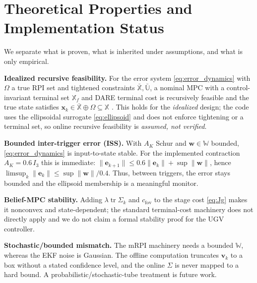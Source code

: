 \documentclass[letterpaper, 10 pt, conference]{ieeeconf}  %
\DeclareMathOperator{\tr}{tr}
\begin{document}
\section{Theoretical Properties and Implementation Status}
\label{sec:theory}

We separate what is proven, what is inherited under assumptions, and what is only
empirical.

\textbf{Idealized recursive feasibility.} For the error system
\eqref{eq:error_dynamics} with $\Omega$ a true RPI set and tightened constraints
$\bar{\mathbb{X}},\bar{\mathbb{U}}$, a nominal MPC with a control-invariant
terminal set $\mathbb{X}_f$ and DARE terminal cost is recursively feasible and the
true state satisfies $\mathbf{x}_k\in\bar{\mathbb{X}}\oplus\Omega\subseteq\mathbb{X}$
\cite{mayne2005robust,mRPI}. This holds for the \emph{idealized} design; the code
uses the ellipsoidal surrogate \eqref{eq:ellipsoid} and does not enforce
tightening or a terminal set, so online recursive feasibility is \emph{assumed,
not verified}.

\textbf{Bounded inter-trigger error (ISS).} With $A_K$ Schur and
$\mathbf{w}\in\mathbb{W}$ bounded, \eqref{eq:error_dynamics} is input-to-state
stable. For the implemented contraction $A_K=0.6\,I_3$ this is immediate:
$\lVert\mathbf{e}_{k+1}\rVert\le 0.6\lVert\mathbf{e}_k\rVert+\sup\lVert\mathbf{w}\rVert$,
hence $\limsup_k\lVert\mathbf{e}_k\rVert\le\sup\lVert\mathbf{w}\rVert/0.4$. Thus,
between triggers, the error stays bounded and the ellipsoid membership is a
meaningful monitor.

\textbf{Belief-MPC stability.} Adding $\lambda\tr\Sigma_k$ and $c_{\mathrm{fov}}$
to the stage cost \eqref{eq:Jg} makes it nonconvex and state-dependent; the
standard terminal-cost machinery does not directly apply and we do not claim a
formal stability proof for the UGV controller.

\textbf{Stochastic/bounded mismatch.} The mRPI machinery needs a bounded
$\mathbb{W}$, whereas the EKF noise is Gaussian. The offline computation truncates
$\mathbf{v}_k$ to a box without a stated confidence level, and the online
$\Sigma$ is never mapped to a hard bound. A probabilistic/stochastic-tube
treatment is future work.
\end{document}
